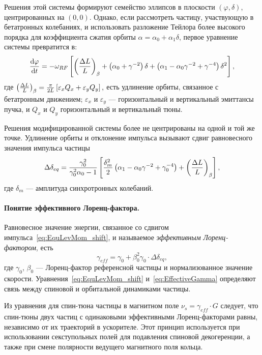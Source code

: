 Решения этой системы формируют семейство эллипсов в плоскости
$(\varphi, \delta)$, центрированных на $(0,0)$. Однако, если
рассмотреть частицу, участвующую в бетатронных колебаниях, и
использовать разложение Тейлора более высокого порядка для
коэффициента сжатия орбиты $\alpha = \alpha_0 + \alpha_1\delta$,
первое уравнение системы превратится в:~\cite[стр.~2579]{Senichev:IPAC13}
\[
\ddt{\varphi} = -\w_{RF} \bkt*{\bkt{\frac{\Delta L}{L}}_\beta + \bkt{\alpha_0 + \gamma^{-2}}\delta + \bkt{\alpha_1 - \alpha_0\gamma^{-2} + \gamma^{-4}}\delta^2},
\]
где $\bkt{\frac{\Delta L}{L}}_\beta =
\frac{\pi}{2L}\bkt*{\varepsilon_xQ_x + \varepsilon_yQ_y},$ есть
удлинение орбиты, связанное с бетатронным движением; $\varepsilon_x$ и
$\varepsilon_y$ --- горизонтальный и вертикальный эмиттансы пучка, и
$Q_x$ и $Q_y$ горизонтальный и вертикальный тюны.~\cite[стр.~2580]{Senichev:IPAC13}

Решения модифицированной системы более не центрированы на одной и той
же точке. Удлинение орбиты и отклонение импульса вызывают сдвиг
равновесного значения импульса частицы~\cite[стр.~2581]{Senichev:IPAC13}
\begin{equation}\label{eq:EquLevMom_shift}
\Delta\delta_{eq} = \frac{\gamma_0^2}{\gamma_0^2\alpha_0 - 1}\bkt*{\frac{\delta_m^2}{2}\bkt{\alpha_1 - \alpha_0\gamma^{-2} + \gamma_0^{-4}} + \bkt{\frac{\Delta L}{L}}_\beta},
\end{equation}
где $\delta_m$ --- амплитуда синхротронных колебаний.

\paragraph{Понятие эффективного Лоренц-фактора.}
Равновесное значение энергии, связанное со сдвигом импульса~\eqref{eq:EquLevMom_shift}, и называемое \emph{эффективным Лоренц-фактором}, есть~\cite{Senichev:FDM}
\begin{equation}\label{eq:EffectiveGamma}
\gamma_{eff} = \gamma_0 + \beta_0^2\gamma_0\cdot\Delta\delta_{eq},
\end{equation}
где $\gamma_0$, $\beta_0$ --- Лоренц-фактор референсной частицы и
нормализованное значение
скорости. Уравнения~\eqref{eq:EquLevMom_shift}
и~\eqref{eq:EffectiveGamma} определяют связь между спиновой и
орбитальной динамиками частицы.

Из уравнения для спин-тюна частицы в магнитном поле $\nu_s = \gamma_{eff}\cdot G$ следует, что спин-тюны двух частиц с одинаковыми эффективными Лоренц-факторами равны, независимо от их траекторий в ускорителе. Этот принцип используется при использовании секступольных полей для подавления спиновой декогеренции, а также при смене полярности ведущего магнитного поля кольца.

